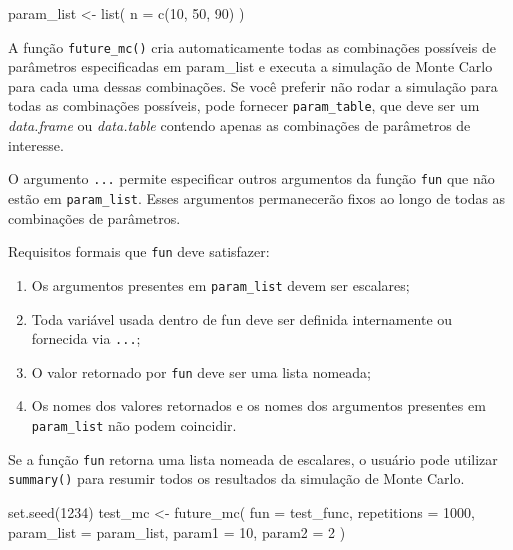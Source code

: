 \documentclass[
  letterpaper,
  DIV=11,
  numbers=noendperiod]{scrreprt}
\newenvironment{Shaded}{\begin{snugshade}}{\end{snugshade}}
\newcommand{\AttributeTok}[1]{\textcolor[rgb]{0.40,0.45,0.13}{#1}}
\newcommand{\DecValTok}[1]{\textcolor[rgb]{0.68,0.00,0.00}{#1}}
\newcommand{\FunctionTok}[1]{\textcolor[rgb]{0.28,0.35,0.67}{#1}}
\newcommand{\NormalTok}[1]{\textcolor[rgb]{0.00,0.23,0.31}{#1}}
\newcommand{\OtherTok}[1]{\textcolor[rgb]{0.00,0.23,0.31}{#1}}
\begin{document}
\begin{Shaded}
\begin{Highlighting}[]
\NormalTok{param\_list }\OtherTok{\textless{}{-}} \FunctionTok{list}\NormalTok{(}
 \AttributeTok{n =} \FunctionTok{c}\NormalTok{(}\DecValTok{10}\NormalTok{, }\DecValTok{50}\NormalTok{, }\DecValTok{90}\NormalTok{)}
\NormalTok{)}
\end{Highlighting}
\end{Shaded}

A função \texttt{future\_mc()} cria automaticamente todas as combinações
possíveis de parâmetros especificadas em param\_list e executa a
simulação de Monte Carlo para cada uma dessas combinações. Se você
preferir não rodar a simulação para todas as combinações possíveis, pode
fornecer \texttt{param\_table}, que deve ser um \emph{data.frame} ou
\emph{data.table} contendo apenas as combinações de parâmetros de
interesse.

O argumento \texttt{...} permite especificar outros argumentos da função
\texttt{fun} que não estão em \texttt{param\_list}. Esses argumentos
permanecerão fixos ao longo de todas as combinações de parâmetros.

Requisitos formais que \texttt{fun} deve satisfazer:

\begin{enumerate}
\def\labelenumi{\arabic{enumi}.}
\item
  Os argumentos presentes em \texttt{param\_list} devem ser escalares;
\item
  Toda variável usada dentro de fun deve ser definida internamente ou
  fornecida via \texttt{...};
\item
  O valor retornado por \texttt{fun} deve ser uma lista nomeada;
\item
  Os nomes dos valores retornados e os nomes dos argumentos presentes em
  \texttt{param\_list} não podem coincidir.
\end{enumerate}

Se a função \texttt{fun} retorna uma lista nomeada de escalares, o
usuário pode utilizar \texttt{summary()} para resumir todos os
resultados da simulação de Monte Carlo.

\begin{Shaded}
\begin{Highlighting}[]
\FunctionTok{set.seed}\NormalTok{(}\DecValTok{1234}\NormalTok{)}
\NormalTok{test\_mc }\OtherTok{\textless{}{-}} \FunctionTok{future\_mc}\NormalTok{(}
  \AttributeTok{fun =}\NormalTok{ test\_func,}
  \AttributeTok{repetitions =} \DecValTok{1000}\NormalTok{,}
  \AttributeTok{param\_list =}\NormalTok{ param\_list,}
  \AttributeTok{param1 =} \DecValTok{10}\NormalTok{,}
  \AttributeTok{param2 =} \DecValTok{2}
\NormalTok{)}
\end{Highlighting}
\end{Shaded}
\end{document}
